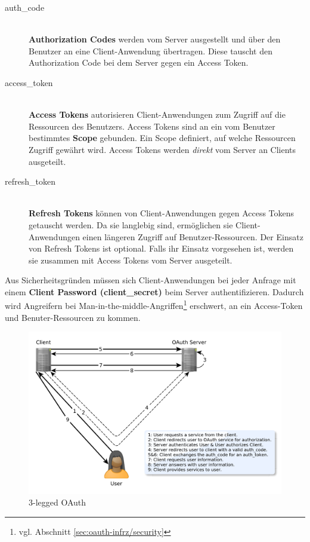 \documentclass[12pt,a4paper,pointednumbers,abstracton]{scrartcl}
\begin{document}
\begin{description}
	\item[auth\_code] \hfill \\
		\textbf{Authorization Codes} werden vom Server ausgestellt und über den Benutzer an eine Client-Anwendung übertragen.
		Diese tauscht den Authorization Code bei dem Server gegen ein Access Token.
	\item[access\_token] \hfill \\
		\textbf{Access Tokens} autorisieren Client-Anwendungen zum Zugriff auf die Ressourcen des Benutzers.
		Access Tokens sind an ein vom Benutzer bestimmtes \textbf{Scope} gebunden.
		Ein Scope definiert, auf welche Ressourcen Zugriff gewährt wird.
		Access Tokens werden \emph{direkt} vom Server an Clients ausgeteilt.
	\item[refresh\_token] \hfill \\
		\textbf{Refresh Tokens} können von Client-Anwendungen gegen Access Tokens getauscht werden.
		Da sie langlebig sind, ermöglichen sie Client-Anwendungen einen längeren Zugriff auf Benutzer-Ressourcen.
		Der Einsatz von Refresh Tokens ist optional.
		Falls ihr Einsatz vorgesehen ist, werden sie zusammen mit Access Tokens vom Server ausgeteilt.
\end{description}

Aus Sicherheitsgründen müssen sich Client-Anwendungen bei jeder Anfrage mit einem \textbf{Client Password (client\_secret)} beim Server authentifizieren.
Dadurch wird Angreifern bei Man-in-the-middle-Angriffen\footnote{vgl. Abschnitt \ref{sec:oauth-infrz/security}} erschwert, an ein Access-Token und Benuter-Ressourcen zu kommen.

\begin{figure}[h!]
\centering
\includegraphics[width=15.5cm]{img/oauth2_workflow}
\caption{3-legged OAuth}
\label{pic:oauth2_workflow}
\end{figure}
\end{document}
